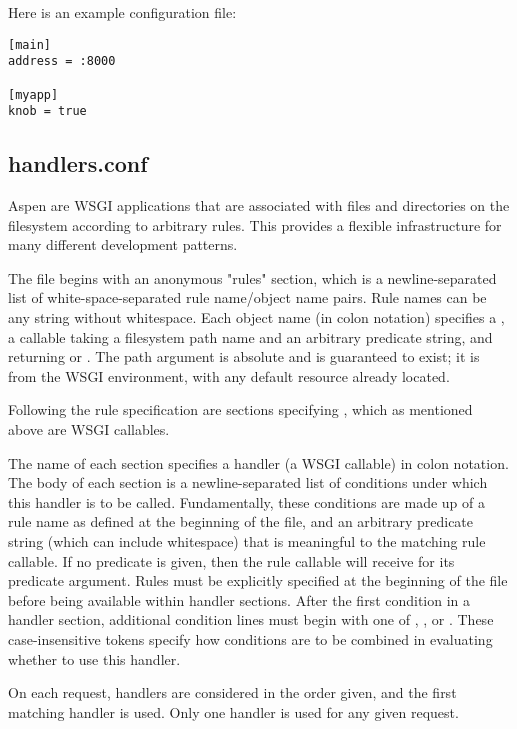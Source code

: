 Here is an example  configuration file:

\begin{verbatim}
[main]
address = :8000

[myapp]
knob = true
\end{verbatim}


\subsection{handlers.conf}
\label{handlers-conf}

Aspen  are WSGI applications that are associated with files and
directories on the filesystem according to arbitrary rules. This provides a
flexible infrastructure for many different development patterns.

The  file begins with an anonymous "rules" section,
which is a newline-separated list of white-space-separated rule name/object name
pairs. Rule names can be any string without whitespace. Each object name (in
colon notation) specifies a , a callable taking a filesystem path name
and an arbitrary predicate string, and returning  or .
The path argument is absolute and is guaranteed to exist; it is
 from the WSGI environment, with any default resource
already located.

Following the rule specification are sections specifying , which
as mentioned above are WSGI callables.

The name of each section specifies a handler (a WSGI callable) in colon
notation. The body of each section is a newline-separated list of conditions
under which this handler is to be called. Fundamentally, these conditions are
made up of a rule name as defined at the beginning of the file, and an arbitrary
predicate string (which can include whitespace) that is meaningful to the
matching rule callable. If no predicate is given, then the rule callable will
receive  for its predicate argument. Rules must be explicitly
specified at the beginning of the file before being available within handler
sections. After the first condition in a handler section, additional condition
lines must begin with one of , , or . These
case-insensitive tokens specify how conditions are to be combined in evaluating
whether to use this handler.

On each request, handlers are considered in the order given, and the first
matching handler is used. Only one handler is used for any given request.

